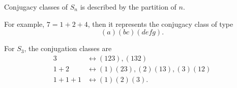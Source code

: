 \begin{theorem}
    Conjugacy classes of \(S_n\) is described by the partition of \(n\).  
\end{theorem}

For example, \(7 = 1 + 2 + 4\), then it represents the conjugacy class of type 
\[
    (a)(bc)(defg).
\] 
\begin{eg}
    For \(S_3\), the conjugation classes are 
    \begin{align*}
        3 &\leftrightarrow (123), (132) \\
        1 + 2 &\leftrightarrow (1)(23), (2)(13), (3)(12) \\
        1+1+1 &\leftrightarrow (1)(2)(3).
    \end{align*} 
\end{eg}
